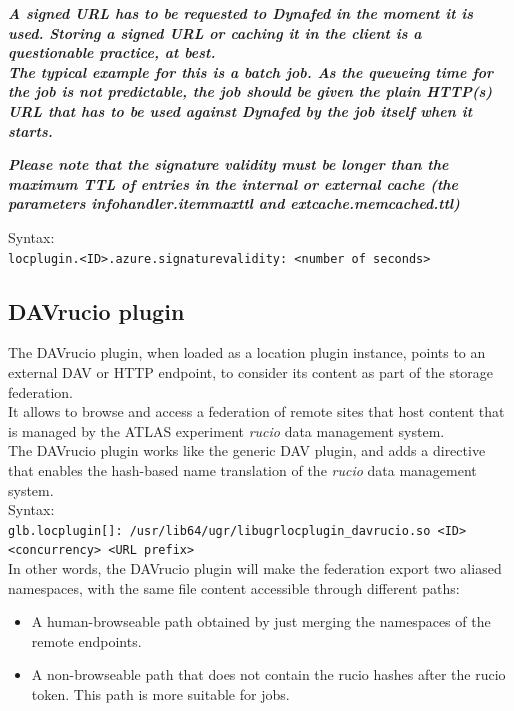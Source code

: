 \documentclass[12pt]{article} %
\begin{document}
\textit{\textbf{A signed URL has to be requested to Dynafed in the moment it is used. Storing a signed URL or caching it in the client
is a questionable practice, at best.\\
The typical example for this is a batch job. As the queueing time for the job is not predictable, the job should
be given the plain HTTP(s) URL that has to be used against Dynafed by the job itself when it starts.\\}}

\textit{\textbf{Please note that the signature validity must be longer than the maximum TTL of entries in the internal or
external cache (the parameters infohandler.itemmaxttl and extcache.memcached.ttl)\\}}

Syntax:\\
\lstinline"locplugin.<ID>.azure.signaturevalidity: <number of seconds>"\\





\subsection{DAVrucio plugin}
The DAVrucio plugin, when loaded as a location plugin instance, points to an external DAV or HTTP endpoint, to consider its content as part of the storage federation.\\
It allows to browse and access a federation of remote sites that host content that is managed by the ATLAS experiment \textit{rucio} data management system.\\
The DAVrucio plugin works like the generic DAV plugin, and adds a directive that enables the hash-based name translation of the \textit{rucio} data management system.\\

Syntax:\\
\lstinline"glb.locplugin[]: /usr/lib64/ugr/libugrlocplugin_davrucio.so <ID> <concurrency> <URL prefix>"\\

In other words, the DAVrucio plugin will make the federation export two aliased namespaces, with the same file content accessible through different paths:
\begin{itemize}
 \item A human-browseable path obtained by just merging the namespaces of the remote endpoints.
 \item A non-browseable path that does not contain the rucio hashes after the rucio token. This path is more suitable for jobs.
\end{itemize}
\end{document}
